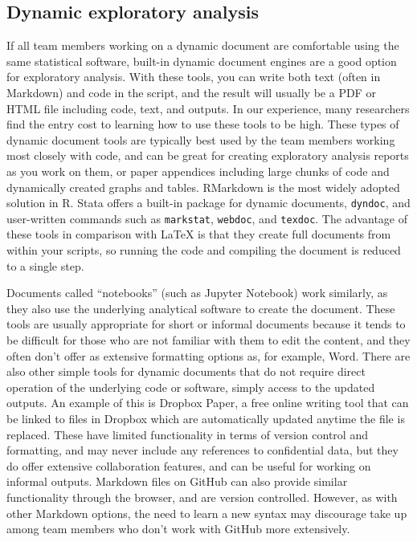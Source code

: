 \subsection{Dynamic exploratory analysis}

If all team members working on a dynamic document are comfortable using the same statistical software,
built-in dynamic document engines are a good option for exploratory analysis.
With these tools,
you can write both text (often in Markdown) and code in the script,
and the result will usually be a PDF or HTML file including code, text, and outputs.
In our experience, many researchers find the entry cost to learning how to use these tools to be high.
These types of dynamic document tools are typically best used by the team members working most closely with code,
and can be great for creating exploratory analysis reports as you work on them,
or paper appendices including large chunks of code and dynamically created graphs and tables.
RMarkdown is the most widely adopted solution in R.
Stata offers a built-in package for dynamic documents, \texttt{dyndoc},
and user-written commands such as \texttt{markstat},
\texttt{webdoc}, and
\texttt{texdoc}.
The advantage of these tools in comparison with LaTeX is that
they create full documents from within your scripts,
so running the code and compiling the document is reduced to a single step.

Documents called ``notebooks'' 
(such as Jupyter Notebook) 
work similarly,
as they also use the underlying analytical software to create the document.
These tools are usually appropriate for short or informal documents
because it tends to be difficult for those who are not familiar with them to edit the content,
and they often don't offer as extensive formatting options as, for example, Word.
There are also other simple tools for dynamic documents
that do not require direct operation of the underlying code or software,
simply access to the updated outputs.
An example of this is Dropbox Paper,
a free online writing tool that can be linked to files in Dropbox
which are automatically updated anytime the file is replaced.
These have limited functionality in terms of version control and formatting,
and may never include any references to confidential data,
but they do offer extensive collaboration features,
and can be useful for working on informal outputs.
Markdown files on GitHub can also provide similar functionality through the browser,
and are version controlled.
However, as with other Markdown options, the need to learn a new syntax may
discourage take up among team members who don't work with GitHub more extensively.

